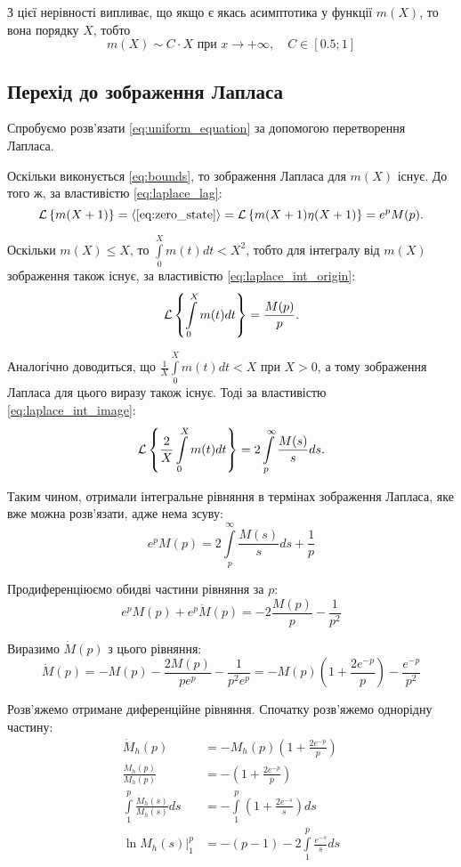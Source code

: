 З цієї нерівності випливає, що якщо є якась асимптотика у функції $m(X)$, то вона порядку $X$, тобто
\begin{equation}
	\label{eq:bounds_inference}
	m(X) \sim C\cdot X \text{ при } x \rightarrow +\infty, \quad C \in [0.5; 1]
\end{equation}

\subsection{Перехід до зображення Лапласа}
\label{sec:uniform_integral_laplace}

Спробуємо розв'язати \eqref{eq:uniform_equation} за допомогою перетворення Лапласа.

Оскільки виконується \eqref{eq:bounds}, то зображення Лапласа для $m(X)$ існує. До того ж, за властивістю \eqref{eq:laplace_lag}:
$$\mathcal{L}\left\{m(X+1)\right\}=\langle\eqref{eq:zero_state}\rangle=\mathcal{L}\left\{m(X+1)\eta(X+1)\right\}=e^p M(p).$$

Оскільки $m(X) \leq X$, то $\int\limits_0^X m(t) dt < X^2$, тобто для інтегралу від $m(X)$ зображення також існує, за властивістю \eqref{eq:laplace_int_origin}:
$$\mathcal{L}\left\{\int\limits_0^X m(t) dt\right\} = \frac{M(p)}{p}.$$

Аналогічно доводиться, що $\frac{1}{X}\int\limits_0^X m(t) dt < X$ при $X>0$, а тому зображення Лапласа для цього виразу також існує. Тоді за властивістю \eqref{eq:laplace_int_image}:
$$\mathcal{L}\left\{\frac{2}{X}\int\limits_0^X m(t) dt\right\} = 2 \int\limits_p^\infty \frac{M(s)}{s} ds.$$

Таким чином, отримали інтегральне рівняння в термінах зображення Лапласа, яке вже можна розв'язати, адже нема зсуву:
\begin{equation}
	\label{eq:uniform_laplace_integral}
	e^p M(p) = 2 \int\limits_p^\infty \frac{M(s)}{s} ds + \frac{1}{p}
\end{equation}

Продиференціюємо обидві частини рівняння за $p$:
\begin{equation}
	e^p M(p) + e^p \dot M(p) = - 2\frac{M(p)}{p}  - \frac1{p^2}
\end{equation}

Виразимо $\dot M(p)$ з цього рівняння:
\begin{equation}
	\label{eq:uniform_laplace_diff}
	\dot M(p) = -M(p) - \frac{2M(p)}{pe^p} - \frac{1}{p^2 e^p} = - M(p)\left(1 + \frac{2e^{-p}}{p}\right) - \frac{e^{-p}}{p^2}
\end{equation}

Розв'яжемо отримане диференційне рівняння. Спочатку розв'яжемо однорідну частину:
\begin{align*}
	\dot M_h (p) &= - M_h (p)\left(1 + \frac{2e^{-p}}{p}\right) \\
	\frac{\dot M_h (p)}{M_h (p)} &= -\left(1 + \frac{2e^{-p}}{p}\right) \\
	\int\limits_1^p \frac{\dot M_h (s)}{M_h (s)} ds &= -\int\limits_1^p \left(1 + \frac{2e^{-s}}{s}\right) ds \\
	\left. \ln{M_h (s)}\right|_1^p &= - (p - 1) - 2 \int\limits_1^p \frac{e^{-s}}{s} ds
\end{align*}

